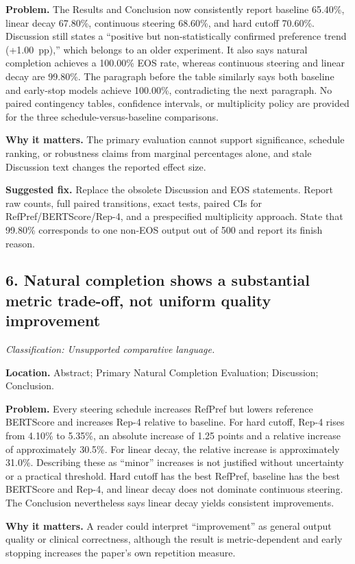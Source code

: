 \documentclass[11pt]{article}
\newcommand{\findinglabel}[1]{\textbf{#1}}
\newcommand{\classification}[1]{\textit{Classification: #1.}}
\begin{document}
\findinglabel{Problem.} The Results and Conclusion now consistently report baseline 65.40\%, linear decay 67.80\%, continuous steering 68.60\%, and hard cutoff 70.60\%.  Discussion still states a ``positive but non-statistically confirmed preference trend (+1.00~pp),'' which belongs to an older experiment.  It also says natural completion achieves a 100.00\% EOS rate, whereas continuous steering and linear decay are 99.80\%.  The paragraph before the table similarly says both baseline and early-stop models achieve 100.00\%, contradicting the next paragraph.  No paired contingency tables, confidence intervals, or multiplicity policy are provided for the three schedule-versus-baseline comparisons.

\findinglabel{Why it matters.} The primary evaluation cannot support significance, schedule ranking, or robustness claims from marginal percentages alone, and stale Discussion text changes the reported effect size.

\findinglabel{Suggested fix.} Replace the obsolete Discussion and EOS statements.  Report raw counts, full paired transitions, exact tests, paired CIs for RefPref/BERTScore/Rep-4, and a prespecified multiplicity approach.  State that 99.80\% corresponds to one non-EOS output out of 500 and report its finish reason.

\subsection*{6. Natural completion shows a substantial metric trade-off, not uniform quality improvement}

\classification{Unsupported comparative language}

\findinglabel{Location.} Abstract; Primary Natural Completion Evaluation; Discussion; Conclusion.

\findinglabel{Problem.} Every steering schedule increases RefPref but lowers reference BERTScore and increases Rep-4 relative to baseline.  For hard cutoff, Rep-4 rises from 4.10\% to 5.35\%, an absolute increase of 1.25 points and a relative increase of approximately 30.5\%.  For linear decay, the relative increase is approximately 31.0\%.  Describing these as ``minor'' increases is not justified without uncertainty or a practical threshold.  Hard cutoff has the best RefPref, baseline has the best BERTScore and Rep-4, and linear decay does not dominate continuous steering.  The Conclusion nevertheless says linear decay yields consistent improvements.

\findinglabel{Why it matters.} A reader could interpret ``improvement'' as general output quality or clinical correctness, although the result is metric-dependent and early stopping increases the paper's own repetition measure.
\end{document}
